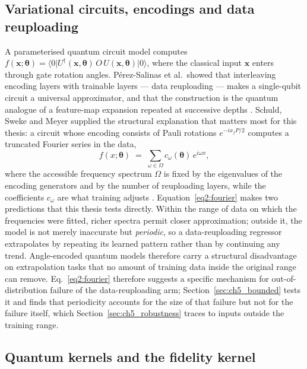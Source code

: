 \documentclass[Thesis.tex]{subfiles}
\begin{document}
\subsection{Variational circuits, encodings and data reuploading}

A parameterised quantum circuit model computes
$f(\mathbf{x};\boldsymbol{\theta}) = \langle 0\rvert
U^{\dagger}(\mathbf{x},\boldsymbol{\theta})\, O \,
U(\mathbf{x},\boldsymbol{\theta}) \lvert 0\rangle$, where the classical input
$\mathbf{x}$ enters through gate rotation angles. P\'erez-Salinas et al.\
showed that interleaving encoding layers with trainable layers --- data
reuploading --- makes a single-qubit circuit a universal approximator, and that
the construction is the quantum analogue of a feature-map expansion repeated
at successive depths \cite{perezsalinas2020reuploading}. Schuld, Sweke and
Meyer supplied the structural explanation that matters most for this thesis: a
circuit whose encoding consists of Pauli rotations $e^{-i x_{j} P/2}$ computes a
truncated Fourier series in the data,
\begin{equation}
  f(x;\boldsymbol{\theta}) \;=\; \sum_{\omega \in \Omega} c_{\omega}(\boldsymbol{\theta})\, e^{i \omega x},
  \label{eq2:fourier}
\end{equation}
where the accessible frequency spectrum $\Omega$ is fixed by the eigenvalues of
the encoding generators and by the number of reuploading layers, while the
coefficients $c_{\omega}$ are what training adjusts
\cite{schuld2021effect}. Equation~\eqref{eq2:fourier} makes two predictions
that this thesis tests directly. Within the range of data on which the
frequencies were fitted, richer spectra permit closer approximation; outside
it, the model is not merely inaccurate but \emph{periodic}, so a
data-reuploading regressor extrapolates by repeating its learned pattern rather
than by continuing any trend. Angle-encoded quantum models therefore carry a
structural disadvantage on extrapolation tasks that no amount of training data
inside the original range can remove. Eq.~\eqref{eq2:fourier} therefore
suggests a specific mechanism for out-of-distribution failure of the
data-reuploading arm; Section~\ref{sec:ch5_bounded} tests it and finds that
periodicity accounts for the size of that failure but not for the failure itself,
which Section~\ref{sec:ch5_robustness} traces to inputs outside the training
range.

\subsection{Quantum kernels and the fidelity kernel}
\end{document}
